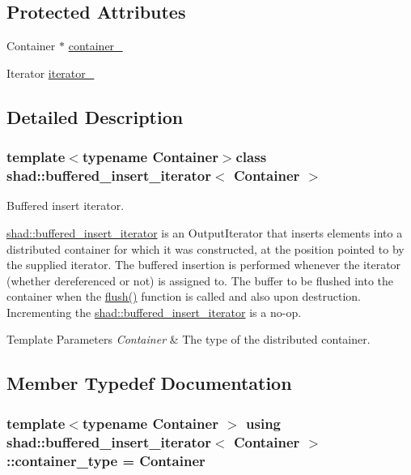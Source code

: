 \subsection*{Protected Attributes}
\begin{DoxyCompactItemize}
\item 
Container $\ast$ \hyperlink{classshad_1_1buffered__insert__iterator_a9503b8887e7d8c9a911293c96898007c}{container\-\_\-}
\item 
Iterator \hyperlink{classshad_1_1buffered__insert__iterator_a47e9e89830c5acbda85c3d6a43cc6713}{iterator\-\_\-}
\end{DoxyCompactItemize}


\subsection{Detailed Description}
\subsubsection*{template$<$typename Container$>$class shad\-::buffered\-\_\-insert\-\_\-iterator$<$ Container $>$}

Buffered insert iterator. 

\hyperlink{classshad_1_1buffered__insert__iterator}{shad\-::buffered\-\_\-insert\-\_\-iterator} is an Output\-Iterator that inserts elements into a distributed container for which it was constructed, at the position pointed to by the supplied iterator. The buffered insertion is performed whenever the iterator (whether dereferenced or not) is assigned to. The buffer to be flushed into the container when the \hyperlink{classshad_1_1buffered__insert__iterator_aadf229f6aac3dbdfc204b7f6309b2e71}{flush()} function is called and also upon destruction. Incrementing the \hyperlink{classshad_1_1buffered__insert__iterator}{shad\-::buffered\-\_\-insert\-\_\-iterator} is a no-\/op.


\begin{DoxyTemplParams}{Template Parameters}
{\em Container} & The type of the distributed container. \\
\hline
\end{DoxyTemplParams}


\subsection{Member Typedef Documentation}
\hypertarget{classshad_1_1buffered__insert__iterator_a8d1e5c22ad001becf13b9d0f452eecf2}{
\subsubsection[{container\-\_\-type}]{\setlength{\rightskip}{0pt plus 5cm}template$<$typename Container $>$ using {\bf shad\-::buffered\-\_\-insert\-\_\-iterator}$<$ Container $>$\-::{\bf container\-\_\-type} =  Container}}\label{classshad_1_1buffered__insert__iterator_a8d1e5c22ad001becf13b9d0f452eecf2}


